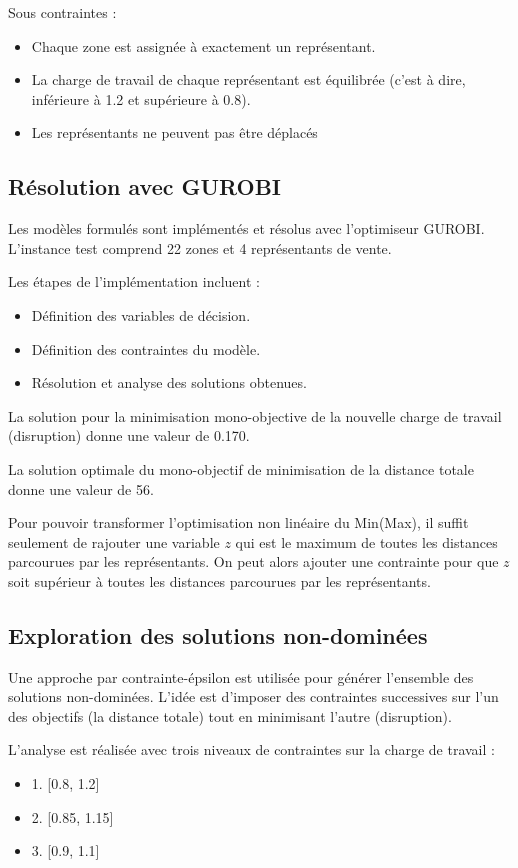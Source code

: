 Sous contraintes :
\begin{itemize}
    \item Chaque zone est assignée à exactement un représentant.
    \item La charge de travail de chaque représentant est équilibrée (c'est à dire, inférieure à 1.2 et supérieure à 0.8).
    \item Les représentants ne peuvent pas être déplacés
\end{itemize}

\subsection{Résolution avec GUROBI}
Les modèles formulés sont implémentés et résolus avec l'optimiseur GUROBI. L'instance test comprend 22 zones et 4 représentants de vente.

Les étapes de l'implémentation incluent :
\begin{itemize}
    \item Définition des variables de décision.
    \item Définition des contraintes du modèle.
    \item Résolution et analyse des solutions obtenues.
\end{itemize}

La solution pour la minimisation mono-objective de la nouvelle charge de travail (disruption) donne une valeur de 0.170.

La solution optimale du mono-objectif de minimisation de la distance totale donne une valeur de 56. 

Pour pouvoir transformer l'optimisation non linéaire du Min(Max), il suffit seulement de rajouter une variable $z$ qui est le maximum de toutes les distances parcourues par les représentants. On peut alors ajouter une contrainte pour que $z$ soit supérieur à toutes les distances parcourues par les représentants.
\subsection{Exploration des solutions non-dominées}
Une approche par contrainte-épsilon est utilisée pour générer l’ensemble des solutions non-dominées. L’idée est d’imposer des contraintes successives sur l’un des objectifs (la distance totale)  tout en minimisant l’autre (disruption).

L’analyse est réalisée avec trois niveaux de contraintes sur la charge de travail :
\begin{itemize}
    \item 1. [0.8, 1.2]
    \item 2. [0.85, 1.15]
    \item 3. [0.9, 1.1]
\end{itemize}

